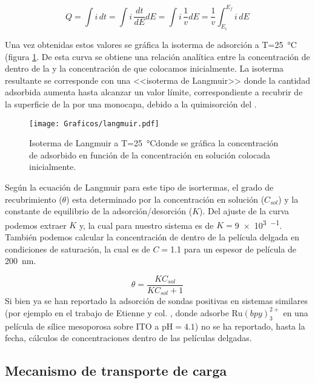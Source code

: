 			\begin{equation}
					Q=\int i\,dt = \int i\, \frac{dt}{dE} dE = \int i\,\frac{1}{v}dE=\frac{1}{v}\int_{E_{i}}^{E_{f}} i\,dE
					\label{eq:carga}
			\end{equation}

		Una vez obtenidas estos valores se gráfica la isoterma de adsorción a T=\SI{25}{\celsius} (figura \ref{fig:langmuir}. De esta curva se obtiene una relación analítica entre la concentración de \ru\space dentro de la \pdm\space y la concentración de \ru{\ru}\space que colocamos inicialmente. La isoterma resultante se corresponde con una <<isoterma de Langmuir>> donde la cantidad adsorbida aumenta hasta alcanzar un valor límite, correspondiente a recubrir de la superficie de la \pdm por una monocapa, debido a la quimisorción del \ru.\cite{langmuir1918}

			\begin{figure}[ht]
					\centering
			 	    \texttt{[image: Graficos/langmuir.pdf]}
			        \caption[Isoterma de Langmuir]{Isoterma de Langmuir a T=\SI{25}{\celsius}donde se gráfica la concentración de \aminorutenio\space adsorbido en función de la concentración en solución colocada inicialmente.}
			        \label{fig:langmuir}
			      	\end{figure} 	
	
		Según la ecuación de Langmuir para este tipo de isortermas, el grado de recubrimiento ($\theta$) esta determinado por la concentración en solución ($C_{sol}$) y la constante de equilibrio de la adsorción/desorción ($K$). Del ajuste de la curva podemos extraer $K$ y, la cual para nuestro sistema es de $K=$\SI{9e3}{\Molar^{-1}}. También podemos calcular la concentración de \ru\space dentro de la película delgada en condiciones de saturación, la cual es de $C=$\SI{1.1}{\Molar} para un espesor de película de \SI{200}{nm}.

			\begin{equation}
					\theta = \frac{KC_{sol}}{KC_{sol}+1}
					\label{eq:langmuir}
			\end{equation}
		Si bien ya se han reportado la adsorción de sondas positivas en sistemas similares (por ejemplo en el trabajo de Etienne y col. \cite{Etienne2007}, donde adsorbe $\text{Ru}(bpy)_3^{2+}$ en una película de sílice mesoporosa sobre ITO a $\text{pH}=4.1$) no se ha reportado, hasta la fecha, cálculos de concentraciones dentro de las películas delgadas.

	\subsection{Mecanismo de transporte de carga}

